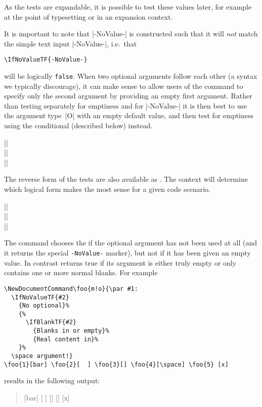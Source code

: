 \documentclass{ltxguide}
\begin{document}
As the  tests are expandable, it is possible to
test these values later, for example at the point of typesetting or
in an expansion context.

It is important to note that |-NoValue-| is constructed such that it
will \emph{not} match the simple text input |-NoValue-|, i.e.~that
\begin{verbatim}
\IfNoValueTF{-NoValue-}
\end{verbatim}
will be logically \texttt{false}.
When two optional arguments follow each other (a syntax we typically
discourage), it can make sense to allow users of the command to
specify only the second argument by providing an empty first
argument.
Rather than testing separately for emptiness and for
|-NoValue-| it is then best to use the argument type~|O| with an
empty default value, and then test for emptiness using the
conditional  (described below) instead.

\begin{decl}
  |\IfValueTF|    \\
  |\IfValueT|    \\
  |\IfValueF|   
\end{decl}
The reverse form of the  tests are also available
as . The context will determine which logical
form makes the most sense for a given code scenario.





\begin{decl}[2022/06/01]
  |\IfBlankTF|    \\
  |\IfBlankT|    \\
  |\IfBlankF|   
\end{decl}


The  command chooses the  if the optional argument has not
been used at all (and it returns the special \texttt{-NoValue-}
marker), but not if it has been given an empty value. In contrast
 returns true if its argument is either truly empty or
only contains one or more normal blanks.
For example
\begin{verbatim}
\NewDocumentCommand\foo{m!o}{\par #1:
  \IfNoValueTF{#2}
    {No optional}%
    {%
      \IfBlankTF{#2}
        {Blanks in or empty}%
        {Real content in}%
    }%
  \space argument!}
\foo{1}[bar] \foo{2}[  ] \foo{3}[] \foo{4}[\space] \foo{5} [x]
\end{verbatim}
results
in the following output:
\begin{quote}
  \NewDocumentCommand{}
  [bar] [  ] [] [\space]  [x]
\end{quote}
\end{document}
